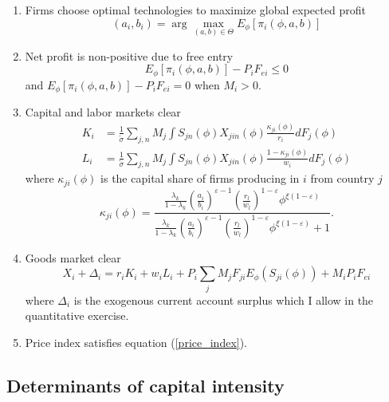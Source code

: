 \documentclass[notitlepage,11pt]{article}%
\begin{document}
\begin{enumerate}
\item Firms choose optimal technologies to maximize global expected profit%
\[
\left(  a_{i},b_{i}\right)  =\arg\max_{\left(  a,b\right)  \in\Theta}E_{\phi
}\left[  \pi_{i}\left(  \phi,a,b\right)  \right]
\]


\item Net profit is non-positive due to free entry%
\[
E_{\phi}\left[  \pi_{i}\left(  \phi,a,b\right)  \right]  -P_{i}F_{ei}\leq0
\]
and $E_{\phi}\left[  \pi_{i}\left(  \phi,a,b\right)  \right]  -P_{i}F_{ei}=0$
when $M_{i}>0$.

\item Capital and labor markets clear%
\begin{align*}
K_{i}  &  =\frac{1}{\tilde{\sigma}}\sum_{j,n}M_{j}\int S_{jn}\left(
\phi\right)  X_{jin}\left(  \phi\right)  \frac{\kappa_{ji}\left(  \phi\right)
}{r_{i}}dF_{j}\left(  \phi\right) \\
L_{i}  &  =\frac{1}{\tilde{\sigma}}\sum_{j,n}M_{j}\int S_{jn}\left(
\phi\right)  X_{jin}\left(  \phi\right)  \frac{1-\kappa_{ji}\left(
\phi\right)  }{w_{i}}dF_{j}\left(  \phi\right)
\end{align*}
where $\kappa_{ji}\left(  \phi\right)  $ is the capital share of firms
producing in $i$ from country $j$%
\[
\kappa_{ji}\left(  \phi\right)  =\frac{\frac{\lambda_{k}}{1-\lambda_{k}%
}\left(  \frac{a_{i}}{b_{i}}\right)  ^{\varepsilon-1}\left(  \frac{r_{l}%
}{w_{l}}\right)  ^{1-\varepsilon}\phi^{\xi\left(  1-\varepsilon\right)  }%
}{\frac{\lambda_{k}}{1-\lambda_{k}}\left(  \frac{a_{i}}{b_{i}}\right)
^{\varepsilon-1}\left(  \frac{r_{l}}{w_{l}}\right)  ^{1-\varepsilon}\phi
^{\xi\left(  1-\varepsilon\right)  }+1}.
\]


\item Goods market clear%
\[
X_{i}+\Delta_{i}=r_{i}K_{i}+w_{i}L_{i}+P_{i}\sum_{j}M_{j}F_{ji}E_{\phi}\left(
S_{ji}\left(  \phi\right)  \right)  +M_{i}P_{i}F_{ei}%
\]
where $\Delta_{i}$ is the exogenous current account surplus which I allow in
the quantitative exercise.

\item Price index satisfies equation (\ref{price_index}).
\end{enumerate}

\subsection{Determinants of capital intensity}
\end{document}
